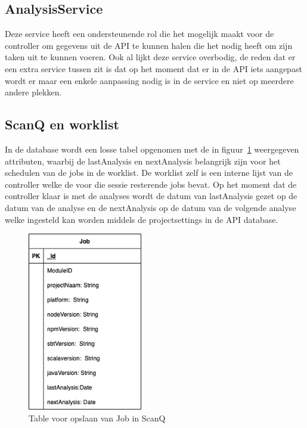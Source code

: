 \subsection{AnalysisService}\label{subsec:analysisservice}
Deze service heeft een ondersteunende rol die het mogelijk maakt voor de controller om gegevens uit de API te kunnen halen die het nodig heeft om zijn taken uit te kunnen voeren. Ook al lijkt deze service overbodig, de reden dat er een extra service tussen zit is dat op het moment dat er in de API iets aangepast wordt er maar een enkele aanpassing nodig is in de service en niet op meerdere andere plekken.

\subsection{ScanQ en worklist}\label{subsec:scanq}
In de database wordt een losse tabel opgenomen met de in figuur~\ref{fig:scanQERD} weergegeven attributen, waarbij de lastAnalysis en nextAnalysis belangrijk zijn voor het schedulen van de jobs in de worklist.
De worklist zelf is een interne lijst van de controller welke de voor die sessie resterende jobs bevat. Op het moment dat de controller klaar is met de analyses wordt de datum van lastAnalysis gezet op de datum van de analyse en de nextAnalysis op de datum van de volgende analyse welke ingesteld kan worden middels de projectsettings in de API database.
\begin{figure}[bth]
    \myfloatalign
    \includegraphics[width=5cm]{gfx/SOUPAPI-scanQERD}
    \caption{Table voor opslaan van Job in ScanQ}
    \label{fig:scanQERD}
\end{figure}
